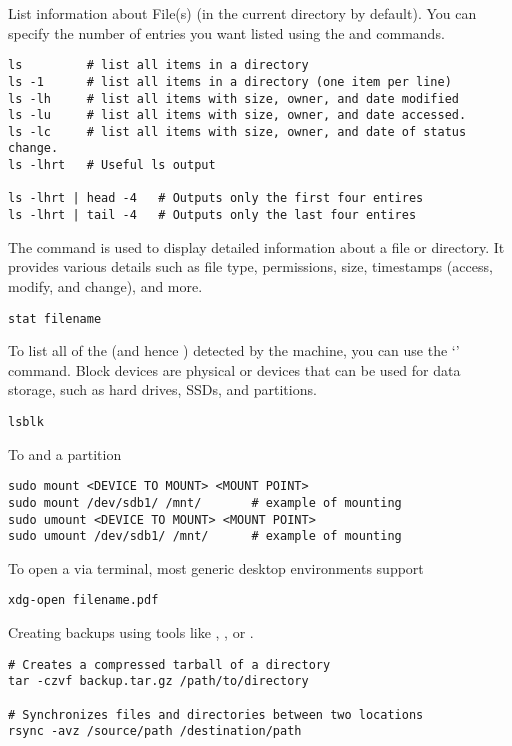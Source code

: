 List information about File(s) (in the current directory by default). You can specify the number of entries you want listed using the  and  commands.
\begin{lstlisting}
ls         # list all items in a directory
ls -1      # list all items in a directory (one item per line)
ls -lh     # list all items with size, owner, and date modified
ls -lu     # list all items with size, owner, and date accessed.
ls -lc     # list all items with size, owner, and date of status change. 
ls -lhrt   # Useful ls output

ls -lhrt | head -4	 # Outputs only the first four entires
ls -lhrt | tail -4	 # Outputs only the last four entires
\end{lstlisting}

The  command is used to display detailed information about a file or directory. It provides various details such as file type, permissions, size, timestamps (access, modify, and change), and more.
\begin{lstlisting}
stat filename
\end{lstlisting}

To list all of the  (and hence ) detected by the machine, you can use the `' command. Block devices are physical or  devices that can be used for data storage, such as hard drives, SSDs, and partitions.\begin{lstlisting}
lsblk
\end{lstlisting}

To  and  a partition
\begin{lstlisting}
sudo mount <DEVICE TO MOUNT> <MOUNT POINT>
sudo mount /dev/sdb1/ /mnt/       # example of mounting
sudo umount <DEVICE TO MOUNT> <MOUNT POINT>
sudo umount /dev/sdb1/ /mnt/      # example of mounting
\end{lstlisting}


To open a  via terminal, most generic desktop environments support
\begin{lstlisting}
xdg-open filename.pdf
\end{lstlisting}

Creating backups using tools like , , or .
\begin{lstlisting}
# Creates a compressed tarball of a directory
tar -czvf backup.tar.gz /path/to/directory

# Synchronizes files and directories between two locations
rsync -avz /source/path /destination/path
\end{lstlisting}











